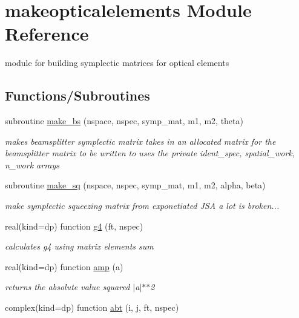 \hypertarget{namespacemakeopticalelements}{}\section{makeopticalelements Module Reference}
\label{namespacemakeopticalelements}


module for building symplectic matrices for optical elements  


\subsection*{Functions/\+Subroutines}
\begin{DoxyCompactItemize}
\item 
subroutine \hyperlink{namespacemakeopticalelements_a593a6ee34afdeebc8b4667791c8a144f}{make\+\_\+bs} (nspace, nspec, symp\+\_\+mat, m1, m2, theta)
\begin{DoxyCompactList}\small\item\em makes beamsplitter symplectic matrix  takes in an allocated matrix for the beamsplitter matrix to be written to uses the private ident\+\_\+spec, spatial\+\_\+work, n\+\_\+work arrays \end{DoxyCompactList}\item 
subroutine \hyperlink{namespacemakeopticalelements_a6658c2ce879c0bc4b2e5918064a6a308}{make\+\_\+sq} (nspace, nspec, symp\+\_\+mat, m1, m2, alpha, beta)
\begin{DoxyCompactList}\small\item\em make symplectic squeezing matrix from exponetiated J\+SA  a lot is broken... \end{DoxyCompactList}\item 
real(kind=dp) function \hyperlink{namespacemakeopticalelements_af1a18704c55aa2efeb60157c81a80723}{g4} (ft, nspec)
\begin{DoxyCompactList}\small\item\em calculates g4 using matrix elements sum  \end{DoxyCompactList}\item 
real(kind=dp) function \hyperlink{namespacemakeopticalelements_a0649740479f47221d009b8d496b78c8b}{amp} (a)
\begin{DoxyCompactList}\small\item\em returns the absolute value squared $\vert$a$\vert$$\ast$$\ast$2 \end{DoxyCompactList}\item 
complex(kind=dp) function \hyperlink{namespacemakeopticalelements_a1b408449683f6bcc96ee25d4bbc1aa8b}{abt} (i, j, ft, nspec)

\end{DoxyCompactItemize}
